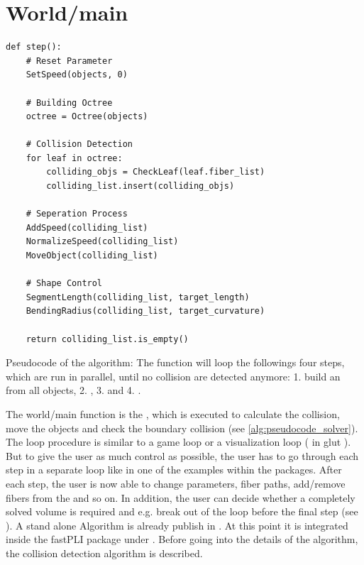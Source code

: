 \section{World/main}
% 
\begin{lstfloat}[!tb]
\lstset{style=python}
\begin{lstlisting}[]
def step():
    # Reset Parameter
    SetSpeed(objects, 0)
    
    # Building Octree
    octree = Octree(objects)
    
    # Collision Detection
    for leaf in octree:
        colliding_objs = CheckLeaf(leaf.fiber_list)
        colliding_list.insert(colliding_objs)
	
    # Seperation Process
    AddSpeed(colliding_list)
    NormalizeSpeed(colliding_list)
    MoveObject(colliding_list)
	
    # Shape Control
    SegmentLength(colliding_list, target_length)
    BendingRadius(colliding_list, target_curvature)

    return colliding_list.is_empty()
\end{lstlisting}
\caption{Pseudocode of the  algorithm: The function  will loop the followings four steps, which are run in parallel, until no collision are detected anymore: 1. build an  from all objects, 2. , 3.  and 4. . }
\label{alg:pseudocode_solver}
\end{lstfloat}
% 
The world/main function is the , which is executed to calculate the collision, move the objects and check the boundary collision (see \cref{alg:pseudocode_solver}).
The loop procedure is similar to a game loop or a visualization loop (\eg{} in glut ).
But to give the user as much control as possible, the user has to go through each step in a separate loop like in one of the examples within the packages.
After each step, the user is now able to change parameters, fiber paths, add/remove fibers from the  and so on.
In addition, the user can decide whether a completely solved volume is required and e.g. break out of the loop before the final step (see \dummy{}).
%
A stand alone Algorithm is already publish in \cite{Matuschke2019}.
At this point it is integrated inside the \ac{fastPLI} package under .
Before going into the details of the algorithm, the collision detection algorithm is described.
% 
% 
% 
